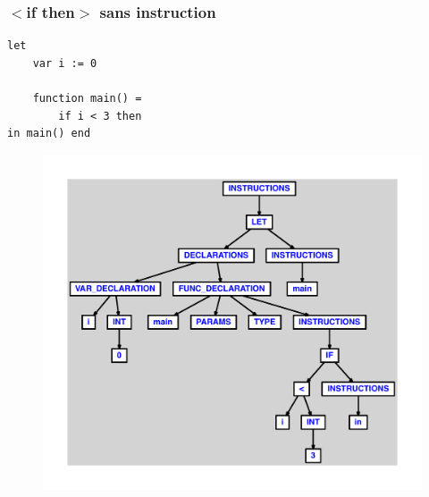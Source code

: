 \documentclass{article}
\begin{document}
\subsubsection{$ < $if then$ > $ sans instruction}
\begin{lstlisting}
let
	var i := 0

	function main() =
		if i < 3 then
in main() end
\end{lstlisting}
\newpage
\begin{figure}[H]
\centering
\includegraphics[max width=\textwidth]{ast/ast_258.pdf}
\end{figure}
\newpage
\end{document}
